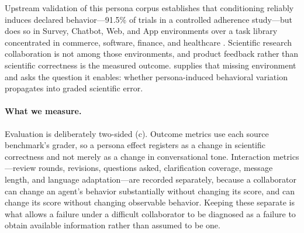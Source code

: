 Upstream validation of this persona corpus establishes that conditioning
reliably induces declared behavior---91.5\% of trials in a controlled
adherence study---but does so in Survey, Chatbot, Web, and App environments
over a task library concentrated in commerce, software, finance, and
healthcare \cite{li2026matraix}. Scientific research collaboration is not
among those environments, and product feedback rather than scientific
correctness is the measured outcome. \benchmark supplies that missing
environment and asks the question it enables: whether persona-induced
behavioral variation propagates into graded scientific error.

\paragraph{What we measure.}
Evaluation is deliberately two-sided (c).
Outcome metrics use each source
benchmark's grader, so a persona effect registers as a change in
scientific correctness and not merely as a change in conversational tone.
Interaction metrics---review rounds, revisions, questions asked,
clarification coverage, message length, and language adaptation---are
recorded separately, because a collaborator can change an agent's behavior
substantially without changing its score, and can change its score without
changing observable behavior. Keeping these separate is what allows a
failure under a difficult collaborator to be diagnosed as a failure to
obtain available information rather than assumed to be one.


